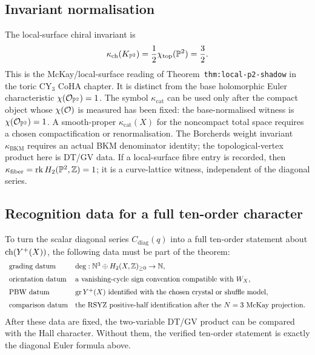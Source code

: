 \subsection*{Invariant normalisation}

The local-surface chiral invariant is
\[
 \kappa_{\mathrm{ch}}(K_{\P^2})
 =\frac{1}{2}\chi_{\mathrm{top}}(\P^2)
 =\frac{3}{2}.
\]
This is the McKay/local-surface reading of
Theorem~\texttt{thm:local-p2-shadow} in the toric CY\(_3\) CoHA chapter.
It is distinct from the base holomorphic Euler characteristic
\(\chi(\cO_{\P^2})=1\). The symbol \(\kappa_{\mathrm{cat}}\) can be
used only after the compact object whose \(\chi(\cO)\) is measured has
been fixed: the base-normalised witness is
\(\chi(\cO_{\P^2})=1\). A smooth-proper
\(\kappa_{\mathrm{cat}}(X)\) for the noncompact total space requires a
chosen compactification or renormalisation. The Borcherds weight
invariant \(\kappa_{\mathrm{BKM}}\) requires an actual BKM denominator
identity; the topological-vertex product here is DT/GV data. If a
local-surface fibre entry is recorded, then
\(\kappa_{\mathrm{fiber}}= \operatorname{rk} H_2(\P^2,\Z)=1\); it is a
curve-lattice witness, independent of the diagonal series.

\subsection*{Recognition data for a full ten-order character}

To turn the scalar diagonal series \(C_{\mathrm{diag}}(q)\) into a full
ten-order statement about \(\ch(\Yplus(X))\), the following data must be
part of the theorem:
\[
\begin{array}{ll}
\text{grading datum} &
  \deg:\mathbb N^3\oplus H_2(X,\Z)_{\ge 0}\to\mathbb N,\\[2mm]
\text{orientation datum} &
  \text{a vanishing-cycle sign convention compatible with }W_X,\\[2mm]
\text{PBW datum} &
  \operatorname{gr}\Yplus(X)\text{ identified with the chosen crystal or shuffle model},\\[2mm]
\text{comparison datum} &
  \text{the RSYZ positive-half identification after the }N=3
  \text{ McKay projection}.
\end{array}
\]
After these data are fixed, the two-variable DT/GV product can be
compared with the Hall character. Without them, the verified ten-order
statement is exactly the diagonal Euler formula above.

